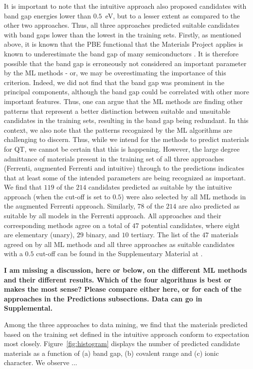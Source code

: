 \documentclass[superscriptaddress,unsortedaddress,
 amsmath,amssymb,
 aps,
]{revtex4-2}
\begin{document}
It is important to note that the intuitive approach also proposed candidates with band gap energies lower than $0.5$~eV, but to a lesser extent as compared to the other two approaches. Thus, all three approaches predicted suitable candidates with band gaps lower than the lowest in the training sets. 
Firstly, as mentioned above, it is known that the PBE functional that the Materials Project applies is known to underestimate the band gap of many semiconductors \cite{Freysoldt2014}. 
It is therefore possible that the band gap is erroneously not considered an important parameter by the ML methods - or, we may be overestimating the importance of this criterion. 
Indeed, we did not find that the band gap was prominent in the principal components, although the band gap could be correlated with other more important features. 
Thus, one can argue that the ML methods are finding other patterns that represent a better distinction between suitable and unsuitable candidates in the training sets, resulting in the band gap being redundant.
In this context, we also note that the patterns recognized by the ML algorithms are challenging to discern. Thus, while we intend for the methods to predict materials for QT, we cannot be certain that this is happening. 
However, the large degree admittance of materials present in the training set of all three approaches (Ferrenti, augmented Ferrenti and intuitive) through to the predictions indicates that at least some of the intended parameters are being recognized as important.  
We find that $119$ of the $214$ candidates predicted as suitable by the intuitive approach (when the cut-off is set to $0.5$) were also selected by all ML methods in the augmented Ferrenti approach. 
Similarly, $78$ of the $214$ are also predicted as suitable by all models in the Ferrenti approach. All approaches and their corresponding methods agree on a total of $47$ potential candidates, where eight are elementary (unary), $29$ binary, and $10$ tertiary.
The list of the $47$ materials agreed on by all ML methods and all three approaches as suitable candidates with a $0.5$ cut-off can be found in the Supplementary Material at \cite{supplementary}. 

\textbf{I am missing a discussion, here or below, on the different ML methods and their different results. Which of the four algorithms is best or makes the most sense? Please compare either here, or for each of the approaches in the Predictions subsections. Data can go in Supplemental.}  
    
Among the three approaches to data mining, we find that the materials predicted based on the training set defined in the intuitive approach conform to expectation most closely. Figure~\ref{fig:histogram} displays the number of predicted candidate materials as a function of (a) band gap, (b) covalent range and (c) ionic character. We observe ... 
\end{document}
